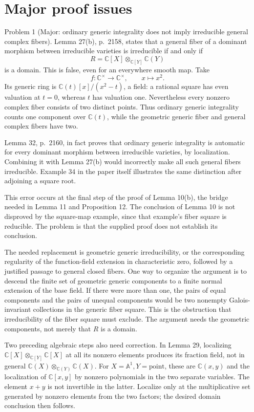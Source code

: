 \documentclass[10pt]{article}
\begin{document}
\section*{Major proof issues}
Problem 1 (Major: ordinary generic integrality does not imply irreducible general complex fibers).  Lemma 27(b), p. 2158, states that a general fiber of a dominant morphism between irreducible varieties is irreducible if and only if \[R=\mathbb C[X]\otimes_{\mathbb C[Y]}\mathbb C(Y)\] is a domain. This is false, even for an everywhere smooth map. Take \[f:\mathbb C^\times\longrightarrow\mathbb C^\times,\qquad x\longmapsto x^2.\] Its generic ring is \(\mathbb C(t)[x]/(x^2-t)\), a field: a rational square has even valuation at \(t=0\), whereas \(t\) has valuation one. Nevertheless every nonzero complex fiber consists of two distinct points. Thus ordinary generic integrality counts one component over \(\mathbb C(t)\), while the geometric generic fiber and general complex fibers have two.\par
Lemma 32, p. 2160, in fact proves that ordinary generic integrality is automatic for every dominant morphism between irreducible varieties, by localization. Combining it with Lemma 27(b) would incorrectly make all such general fibers irreducible. Example 34 in the paper itself illustrates the same distinction after adjoining a square root.\par
This error occurs at the final step of the proof of Lemma 10(b), the bridge needed in Lemma 11 and Proposition 12. The conclusion of Lemma 10 is not disproved by the square-map example, since that example’s fiber square is reducible. The problem is that the supplied proof does not establish its conclusion.\par
The needed replacement is geometric generic irreducibility, or the corresponding regularity of the function-field extension in characteristic zero, followed by a justified passage to general closed fibers. One way to organize the argument is to descend the finite set of geometric generic components to a finite normal extension of the base field. If there were more than one, the pairs of equal components and the pairs of unequal components would be two nonempty Galois-invariant collections in the generic fiber square. This is the obstruction that irreducibility of the fiber square must exclude. The argument needs the geometric components, not merely that \(R\) is a domain.\par
Two preceding algebraic steps also need correction. In Lemma 29, localizing \(\mathbb C[X]\otimes_{\mathbb C[Y]}\mathbb C[X]\) at all its nonzero elements produces its fraction field, not in general \(\mathbb C(X)\otimes_{\mathbb C(Y)}\mathbb C(X)\). For \(X=\mathbb A^1,Y=\mathrm{point}\), these are \(\mathbb C(x,y)\) and the localization of \(\mathbb C[x,y]\) by nonzero polynomials in the two separate variables. The element \(x+y\) is not invertible in the latter. Localize only at the multiplicative set generated by nonzero elements from the two factors; the desired domain conclusion then follows.\par
\end{document}
